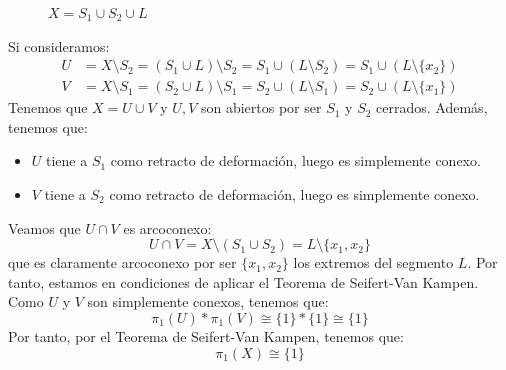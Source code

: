 \begin{ejercicio}
\begin{enumerate}[label=\alph*)]
\begin{figure}[ht]
                \caption{$X = S_1 \cup S_2 \cup L$}
                \label{fig:conjuntoX_D}
            \end{figure}
            Si consideramos:
            \begin{align*}
                U &= X\setminus S_2 = (S_1\cup L)\setminus S_2
                = S_1\cup (L\setminus S_2) = S_1\cup (L\setminus \{x_2\}) \\
                V &= X\setminus S_1 = (S_2\cup L)\setminus S_1
                = S_2\cup (L\setminus S_1) = S_2\cup (L\setminus \{x_1\})
            \end{align*}
            Tenemos que $X = U\cup V$ y $U,V$ son abiertos por ser $S_1$ y $S_2$ cerrados. Además, tenemos que:
            \begin{itemize}
                \item $U$ tiene a $S_1$ como retracto de deformación, luego es simplemente conexo.
                \item $V$ tiene a $S_2$ como retracto de deformación, luego es simplemente conexo.
            \end{itemize}

            Veamos que $U\cap V$ es arcoconexo:
            \begin{equation*}
                U\cap V = X\setminus (S_1\cup S_2) = L\setminus \{x_1,x_2\}
            \end{equation*}
            que es claramente arcoconexo por ser $\{x_1,x_2\}$ los extremos del segmento $L$. Por tanto, estamos en condiciones de aplicar el Teorema de Seifert-Van Kampen. Como $U$ y $V$ son simplemente conexos, tenemos que:
            \begin{equation*}
                \pi_1(U)\ast \pi_1(V) \cong \{1\}\ast \{1\} \cong \{1\}
            \end{equation*}
            Por tanto, por el Teorema de Seifert-Van Kampen, tenemos que:
            \begin{equation*}
                \pi_1(X) \cong \{1\}
            \end{equation*}

\end{enumerate}
\end{ejercicio}
